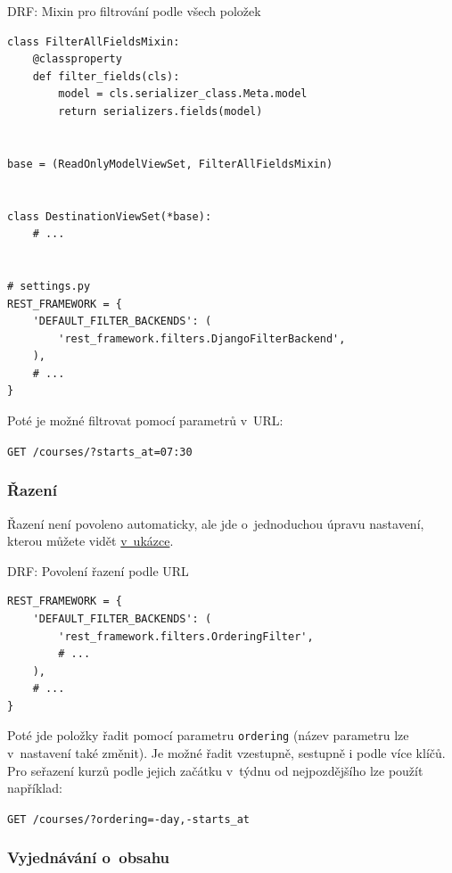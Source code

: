 \begin{listing}[htbp]
\caption{{\label{code:drf:filter}DRF: Mixin pro filtrování podle všech položek}}
\begin{verbatim}
class FilterAllFieldsMixin:
    @classproperty
    def filter_fields(cls):
        model = cls.serializer_class.Meta.model
        return serializers.fields(model)


base = (ReadOnlyModelViewSet, FilterAllFieldsMixin)


class DestinationViewSet(*base):
    # ...


# settings.py
REST_FRAMEWORK = {
    'DEFAULT_FILTER_BACKENDS': (
        'rest_framework.filters.DjangoFilterBackend',
    ),
    # ...
}
\end{verbatim}
\end{listing}

Poté je možné filtrovat pomocí parametrů v~URL:

\verb!GET /courses/?starts_at=07:30!

\subsubsection*{Řazení}\label{ux159azenuxed}

Řazení není povoleno automaticky, ale jde o~jednoduchou úpravu nastavení, kterou můžete vidět \protect\hyperlink{code:drf:sort}{v~ukázce}.

\begin{listing}[htbp]
\caption{{\label{code:drf:sort}DRF: Povolení řazení podle URL}}
\begin{verbatim}
REST_FRAMEWORK = {
    'DEFAULT_FILTER_BACKENDS': (
        'rest_framework.filters.OrderingFilter',
        # ...
    ),
    # ...
}
\end{verbatim}
\end{listing}

Poté jde položky řadit pomocí parametru \verb!ordering! (název parametru lze v~nastavení také změnit). Je možné řadit vzestupně, sestupně i podle více klíčů. Pro seřazení kurzů podle jejich začátku v~týdnu od nejpozdějšího lze použít například:

\verb!GET /courses/?ordering=-day,-starts_at!

\subsubsection*{Vyjednávání o~obsahu}\label{vyjednuxe1vuxe1nuxed-o-obsahu}

